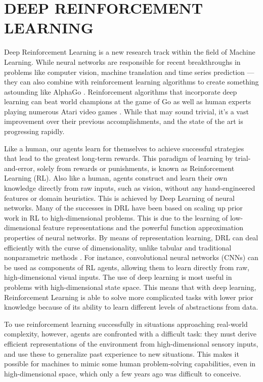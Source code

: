 \documentclass{article}
\begin{document}
\section{DEEP REINFORCEMENT LEARNING}
Deep Reinforcement Learning is a new research track within the field of Machine Learning. While neural networks are responsible for recent breakthroughs in problems like computer vision, machine translation and time series prediction — they can also combine with reinforcement learning algorithms to create something astounding like AlphaGo \cite{silver2016mastering}. Reinforcement algorithms that incorporate deep learning can beat world champions at the game of Go as well as human experts playing numerous Atari video games \cite{mnih2015human}. While that may sound trivial, it’s a vast improvement over their previous accomplishments, and the state of the art is progressing rapidly.

Like a human, our agents learn for themselves to achieve successful strategies that lead to the greatest long-term rewards. This paradigm of learning by trial-and-error, solely from rewards or punishments, is known as Reinforcement Learning (RL). Also like a human, agents construct and learn their own knowledge directly from raw inputs, such as vision, without any hand-engineered features or domain heuristics. This is achieved by Deep Learning of neural networks. Many of the successes in DRL have been based on scaling up prior work in RL to high-dimensional problems. This is due to the learning of low-dimensional feature representations and the powerful function approximation properties of neural networks. By means of representation learning, DRL can deal efficiently with the curse of dimensionality, unlike tabular and traditional nonparametric methods \cite{bengio2013representation}. For instance, convolutional neural networks (CNNs) can be used as components of RL agents, allowing them to learn directly from raw, high-dimensional visual inputs. The use of deep learning is most useful in problems with high-dimensional state space. This means that with deep learning, Reinforcement Learning is able to solve more complicated tasks with lower prior knowledge because of its ability to learn different levels of abstractions from data.

To use reinforcement learning successfully in situations approaching real-world complexity, however, agents are confronted with a difficult task: they must derive efficient representations of the environment from high-dimensional sensory inputs, and use these to generalize past experience to new situations. This makes it possible for machines to mimic some human problem-solving capabilities, even in high-dimensional space, which only a few years ago was difficult to conceive.
\end{document}
